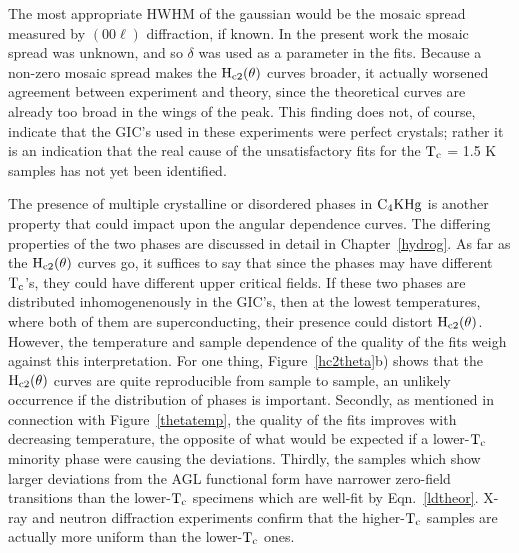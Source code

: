 	The most  appropriate HWHM  of the gaussian   would be the   mosaic
spread measured by $(00\ell)$ diffraction,  if known.   In the present work
the mosaic spread was unknown, and so $\delta$  was used  as a parameter in
the fits.  Because a non-zero mosaic  spread makes the $\rm H_{c2}(\theta)$
curves  broader,  it actually  worsened agreement  between   experiment and
theory, since the theoretical curves are already too broad in the  wings of
the peak.  This finding  does not, of course, indicate  that the GIC's used
in these experiments were perfect crystals; rather it is an indication that
the real cause of the unsatisfactory fits for the $\rm T_c$ = 1.5 K samples
has not yet been identified.

        The presence  of multiple crystalline  or disordered phases in $\rm
C_4KHg$ is another property that  could impact upon  the angular dependence
curves.  The differing properties of the two phases are discussed in detail
in Chapter~\ref{hydrog}.  As far as the  $\rm H_{c2}(\theta)$ curves go, it
suffices to say that since the phases may have different $\rm T_c$'s, they could
have different upper critical fields.   If these two phases are distributed
inhomogenenously in the GIC's, then at  the lowest temperatures, where both
of  them    are  superconducting,     their  presence could   distort  $\rm
H_{c2}(\theta)$.   However,  the temperature and   sample dependence of the
quality  of the  fits weigh against  this interpretation.   For  one thing,
Figure~\ref{hc2theta}b) shows that the  $\rm H_{c2}(\theta)$ curves are quite
reproducible  from sample to  sample,   an  unlikely  occurrence   if   the
distribution of phases is important.  Secondly, as mentioned  in connection
with Figure~\ref{thetatemp}, the quality of the fits improves with decreasing
temperature, the opposite of  what would be  expected if a  lower-$\rm T_c$
minority phase  were causing  the  deviations.  Thirdly, the  samples which
show  larger  deviations from   the   AGL  functional   form have  narrower
zero-field   transitions   than the lower-$\rm T_c$   specimens  which  are
well-fit by Eqn.~\ref{ldtheor}.  X-ray  and neutron diffraction experiments
confirm that  the higher-$\rm   T_c$ samples are  actually more  uniform   than the
lower-$\rm T_c$ ones.

